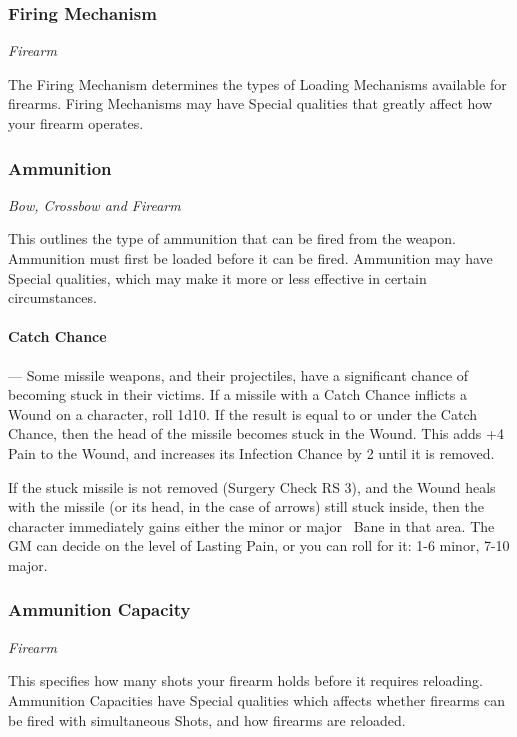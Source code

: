\documentclass[oneside,11pt,english]{book}
\begin{document}
\subsubsection{Firing Mechanism}
\vspace{-10pt}\emph{Firearm}\par
The Firing Mechanism determines the types of Loading Mechanisms available for firearms. Firing 
Mechanisms may have Special qualities that greatly affect how your firearm operates.

\subsubsection{Ammunition}
\vspace{-10pt}\emph{Bow, Crossbow and Firearm}\par
This outlines the type of ammunition that can be fired from the weapon. Ammunition must first be loaded 
before it can be fired. Ammunition may have Special qualities, which may make it more or less effective 
in certain circumstances.

\paragraph{Catch Chance}---\quad
Some missile weapons, and their projectiles, have a significant chance of becoming stuck in their victims. 
If a missile with a Catch Chance inflicts a Wound on a character, roll 1d10. If the result is equal to or 
under the Catch Chance, then the head of the missile becomes stuck in the Wound. This adds +4 Pain to 
the Wound, and increases its Infection Chance by 2 until it is removed. 

If the stuck missile is not removed (Surgery Check RS 3), and the Wound heals with the missile (or its 
head, in the case of arrows) still stuck inside, then the character immediately gains either the minor or 
major ~Bane in that area. The GM can decide on the level of Lasting Pain, or you can roll for it: 1-6 minor, 7-10 major.

\subsubsection{Ammunition Capacity}
\vspace{-10pt}\emph{Firearm}\par
This specifies how many shots your firearm holds before it requires reloading. Ammunition Capacities 
have Special qualities which affects whether firearms can be fired with simultaneous Shots, and how 
firearms are reloaded. 
\end{document}
